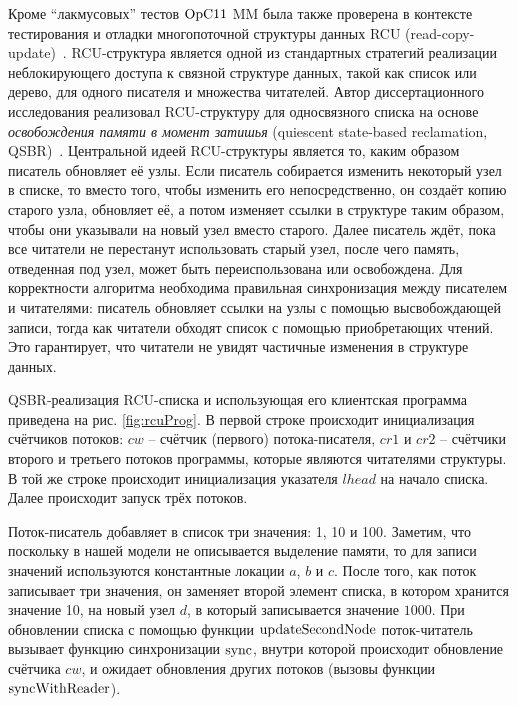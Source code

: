 Кроме ``лакмусовых'' тестов $\mathrm{OpC11}$ MM была также проверена в контексте тестирования и отладки
многопоточной структуры данных RCU\label{acr:rcu} (read-copy-update)~\cite{McKenney-Slingwine:PDCS98,McKenney:PhD}.
RCU-структура является одной из стандартных стратегий реализации неблокирующего доступа к
связной структуре данных, такой как список или дерево, для одного писателя и множества читателей.
Автор диссертационного исследования реализовал RCU-структуру для односвязного списка на основе
\emph{освобождения памяти в момент затишья} (quiescent state-based reclamation, QSBR)\label{acr:qsbr}~\cite{Desnoyers-al:TPDS12}.
Центральной идеей RCU-структуры является то, каким образом писатель обновляет её узлы.
Если писатель собирается изменить некоторый узел в списке, то вместо того, чтобы
изменить его непосредственно, он создаёт копию старого узла, обновляет её, а потом изменяет ссылки в структуре
таким образом, чтобы они указывали на новый узел вместо старого.
Далее писатель ждёт, пока все читатели не перестанут использовать старый узел, после чего
память, отведенная под узел, может быть переиспользована или освобождена.
Для корректности алгоритма необходима
правильная синхронизация между писателем и читателями:
писатель обновляет ссылки на узлы с помощью высвобождающей записи,
тогда как читатели обходят список с помощью приобретающих чтений.
Это гарантирует, что читатели не увидят частичные изменения в структуре данных.

QSBR-реализация RCU-списка и использующая его клиентская программа приведена на рис. \ref{fig:rcuProg}.
В первой строке происходит инициализация счётчиков потоков:
$cw$ -- счётчик (первого) потока-писателя,
$cr1$ и $cr2$ -- счётчики второго и третьего потоков программы, которые являются читателями структуры.
В той же строке происходит инициализация указателя $lhead$ на начало списка.
Далее происходит запуск трёх потоков.

Поток-писатель добавляет в список три значения: 1, 10 и 100.
Заметим, что поскольку в нашей модели не описывается выделение памяти, то для записи значений используются константные локации $a$, $b$ и $c$.
После того, как поток записывает три значения, он заменяет второй элемент списка, в котором хранится значение 10,
на новый узел $d$, в который записывается значение $1000$.
При обновлении списка с помощью функции ${\rm updateSecondNode}$
поток-читатель вызывает функцию синхронизации ${\rm sync}$, внутри которой происходит обновление
счётчика $cw$, и ожидает обновления других потоков (вызовы функции ${\rm syncWithReader}$).

